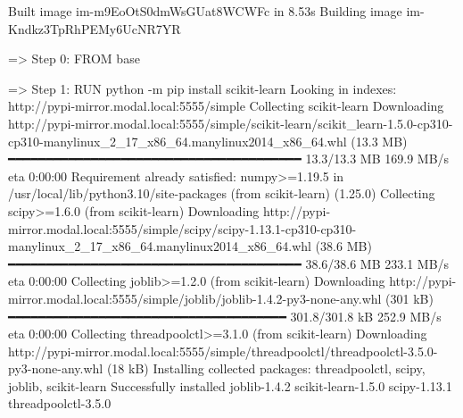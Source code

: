 \documentclass[
  letterpaper,
  DIV=11,
  numbers=noendperiod]{scrreprt}
\newenvironment{Shaded}{\begin{snugshade}}{\end{snugshade}}
\newcommand{\AttributeTok}[1]{\textcolor[rgb]{0.40,0.45,0.13}{#1}}
\newcommand{\ErrorTok}[1]{\textcolor[rgb]{0.68,0.00,0.00}{#1}}
\newcommand{\ExtensionTok}[1]{\textcolor[rgb]{0.00,0.23,0.31}{#1}}
\newcommand{\KeywordTok}[1]{\textcolor[rgb]{0.00,0.23,0.31}{#1}}
\newcommand{\NormalTok}[1]{\textcolor[rgb]{0.00,0.23,0.31}{#1}}
\newcommand{\OperatorTok}[1]{\textcolor[rgb]{0.37,0.37,0.37}{#1}}
\begin{document}
\begin{Shaded}
\begin{Highlighting}[]
\ExtensionTok{Built}\NormalTok{ image im{-}m9EoOtS0dmWsGUat8WCWFc in 8.53s}
\ExtensionTok{Building}\NormalTok{ image im{-}Kndkz3TpRhPEMy6UcNR7YR}

\ExtensionTok{=}\OperatorTok{\textgreater{}}\NormalTok{ Step 0: FROM base}

\ExtensionTok{=}\OperatorTok{\textgreater{}}\NormalTok{ Step 1: RUN python }\AttributeTok{{-}m}\NormalTok{ pip install scikit{-}learn }
\ExtensionTok{Looking}\NormalTok{ in indexes: http://pypi{-}mirror.modal.local:5555/simple}
\ExtensionTok{Collecting}\NormalTok{ scikit{-}learn}
  \ExtensionTok{Downloading}\NormalTok{ http://pypi{-}mirror.modal.local:5555/simple/scikit{-}learn/scikit\_learn{-}1.5.0{-}cp310{-}cp310{-}manylinux\_2\_17\_x86\_64.manylinux2014\_x86\_64.whl }\ErrorTok{(}\ExtensionTok{13.3}\NormalTok{ MB}\KeywordTok{)}
     \ExtensionTok{━━━━━━━━━━━━━━━━━━━━━━━━━━━━━━━━━━━━━━━}\NormalTok{ 13.3/13.3 MB 169.9 MB/s eta 0:00:00}
\ExtensionTok{Requirement}\NormalTok{ already satisfied: numpy}\OperatorTok{\textgreater{}}\NormalTok{=1.19.5 in /usr/local/lib/python3.10/site{-}packages }\ErrorTok{(}\ExtensionTok{from}\NormalTok{ scikit{-}learn}\KeywordTok{)} \KeywordTok{(}\ExtensionTok{1.25.0}\KeywordTok{)}
\ExtensionTok{Collecting}\NormalTok{ scipy}\OperatorTok{\textgreater{}}\NormalTok{=1.6.0 }\ErrorTok{(}\ExtensionTok{from}\NormalTok{ scikit{-}learn}\KeywordTok{)}
  \ExtensionTok{Downloading}\NormalTok{ http://pypi{-}mirror.modal.local:5555/simple/scipy/scipy{-}1.13.1{-}cp310{-}cp310{-}manylinux\_2\_17\_x86\_64.manylinux2014\_x86\_64.whl }\ErrorTok{(}\ExtensionTok{38.6}\NormalTok{ MB}\KeywordTok{)}
     \ExtensionTok{━━━━━━━━━━━━━━━━━━━━━━━━━━━━━━━━━━━━━━━}\NormalTok{ 38.6/38.6 MB 233.1 MB/s eta 0:00:00}
\ExtensionTok{Collecting}\NormalTok{ joblib}\OperatorTok{\textgreater{}}\NormalTok{=1.2.0 }\ErrorTok{(}\ExtensionTok{from}\NormalTok{ scikit{-}learn}\KeywordTok{)}
  \ExtensionTok{Downloading}\NormalTok{ http://pypi{-}mirror.modal.local:5555/simple/joblib/joblib{-}1.4.2{-}py3{-}none{-}any.whl }\ErrorTok{(}\ExtensionTok{301}\NormalTok{ kB}\KeywordTok{)}
     \ExtensionTok{━━━━━━━━━━━━━━━━━━━━━━━━━━━━━━━━━━━━━}\NormalTok{ 301.8/301.8 kB 252.9 MB/s eta 0:00:00}
\ExtensionTok{Collecting}\NormalTok{ threadpoolctl}\OperatorTok{\textgreater{}}\NormalTok{=3.1.0 }\ErrorTok{(}\ExtensionTok{from}\NormalTok{ scikit{-}learn}\KeywordTok{)}
  \ExtensionTok{Downloading}\NormalTok{ http://pypi{-}mirror.modal.local:5555/simple/threadpoolctl/threadpoolctl{-}3.5.0{-}py3{-}none{-}any.whl }\ErrorTok{(}\ExtensionTok{18}\NormalTok{ kB}\KeywordTok{)}
\ExtensionTok{Installing}\NormalTok{ collected packages: threadpoolctl, scipy, joblib, scikit{-}learn}
\ExtensionTok{Successfully}\NormalTok{ installed joblib{-}1.4.2 scikit{-}learn{-}1.5.0 scipy{-}1.13.1 threadpoolctl{-}3.5.0}


\end{Highlighting}
\end{Shaded}
\end{document}
